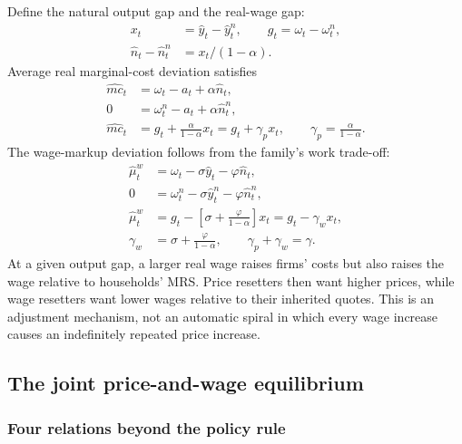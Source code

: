 Define the natural output gap and the real-wage gap:
\begin{align}
 x_t&=\hat y_t-\hat y_t^n,\qquad
 g_t=\omega_t-\omega_t^n,\\
 \hat n_t-\hat n_t^n&=x_t/(1-\alpha).
\end{align}
Average real marginal-cost deviation satisfies
\begin{align}
 \hat{mc}_t&=\omega_t-a_t+\alpha\hat n_t,\\
 0&=\omega_t^n-a_t+\alpha\hat n_t^n,\\
 \hat{mc}_t&=g_t+\frac\alpha{1-\alpha}x_t
            =g_t+\gamma_p x_t,\qquad\gamma_p=\frac\alpha{1-\alpha}.
\end{align}
The wage-markup deviation follows from the family's work trade-off:
\begin{align}
 \hat\mu_t^w&=\omega_t-\sigma\hat y_t-\varphi\hat n_t,\\
 0&=\omega_t^n-\sigma\hat y_t^n-\varphi\hat n_t^n,\\
 \hat\mu_t^w&=g_t-\left[\sigma+\frac\varphi{1-\alpha}\right]x_t
             =g_t-\gamma_wx_t,\\
 \gamma_w&=\sigma+\frac\varphi{1-\alpha},\qquad
 \gamma_p+\gamma_w=\gamma.
 \label{eq:sw-markup-gaps}
\end{align}
At a given output gap, a larger real wage raises firms' costs but also raises
the wage relative to households' MRS. Price resetters then want higher prices,
while wage resetters want lower wages relative to their inherited quotes.
This is an adjustment mechanism, not an automatic spiral in which every wage
increase causes an indefinitely repeated price increase.

\subsection{The joint price-and-wage equilibrium}

\subsubsection{Four relations beyond the policy rule}

